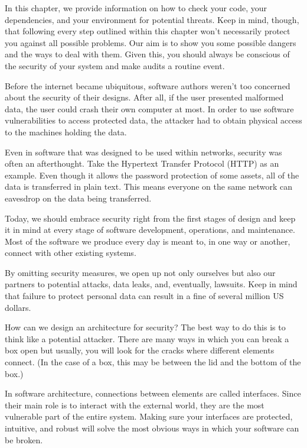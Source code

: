 
In this chapter, we provide information on how to check your code, your dependencies, and your environment for potential threats. Keep in mind, though, that following every step outlined within this chapter won't necessarily protect you against all possible problems. Our aim is to show you some possible dangers and the ways to deal with them. Given this, you should always be conscious of the security of your system and make audits a routine event.

Before the internet became ubiquitous, software authors weren't too concerned about the security of their designs. After all, if the user presented malformed data, the user could crash their own computer at most. In order to use software vulnerabilities to access protected data, the attacker had to obtain physical access to the machines holding the data.

Even in software that was designed to be used within networks, security was often an afterthought. Take the Hypertext Transfer Protocol (HTTP) as an example. Even though it allows the password protection of some assets, all of the data is transferred in plain text. This means everyone on the same network can eavesdrop on the data being transferred.

Today, we should embrace security right from the first stages of design and keep it in mind at every stage of software development, operations, and maintenance. Most of the software we produce every day is meant to, in one way or another, connect with other existing systems.

By omitting security measures, we open up not only ourselves but also our partners to potential attacks, data leaks, and, eventually, lawsuits. Keep in mind that failure to protect personal data can result in a fine of several million US dollars.


How can we design an architecture for security? The best way to do this is to think like a potential attacker. There are many ways in which you can break a box open but usually, you will look for the cracks where different elements connect. (In the case of a box, this may be between the lid and the bottom of the box.)

In software architecture, connections between elements are called interfaces. Since their main role is to interact with the external world, they are the most vulnerable part of the entire system. Making sure your interfaces are protected, intuitive, and robust will solve the most obvious ways in which your software can be broken.

